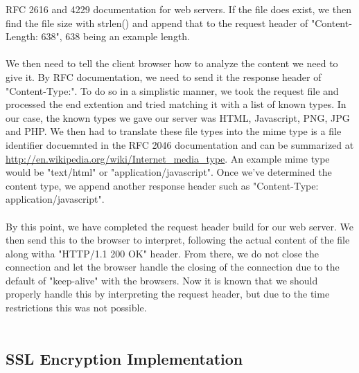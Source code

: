 \documentclass[a4paper,12pt]{article}
\begin{document}
RFC 2616 and 4229 documentation for web servers. If the file does exist,
we then find the file size with strlen() and append that to the request
header of "Content-Length: 638", 638 being an example length.\\
\\
We then need to tell the client browser how to analyze the content
we need to give it. By RFC documentation, we need to send it the
response header of "Content-Type:". To do so in a simplistic manner,
we took the request file and processed the end extention and tried
matching it with a list of known types. In our case, the known types
we gave our server was HTML, Javascript, PNG, JPG and PHP. We then
had to translate these file types into the mime type is a file 
identifier docuemnted in the RFC 2046 documentation and can be
summarized at \url{http://en.wikipedia.org/wiki/Internet_media_type}.
An example mime type would be "text/html" or "application/javascript".
Once we've determined the content type, we append another response header
such as "Content-Type: application/javascript".\\
\\
By this point, we have completed the request header build for
our web server. We then send this to the browser to interpret, following
the actual content of the file along witha "HTTP/1.1 200 OK" header.
From there, we do not close the connection and let the browser handle
the closing of the connection due to the default of "keep-alive" with
the browsers. Now it is known that we should properly handle this
by interpreting the request header, but due to the time restrictions
this was not possible.\\
\\
\subsection{SSL Encryption Implementation}
\end{document}
